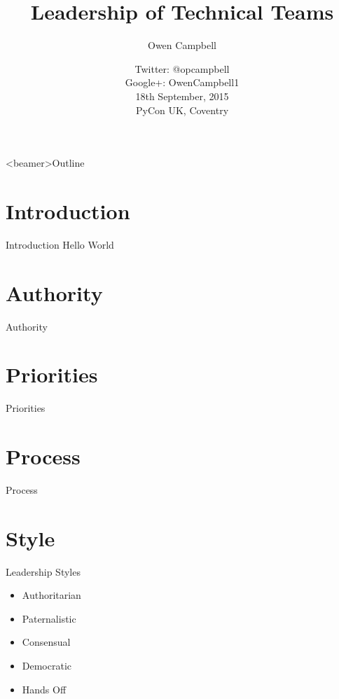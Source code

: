 \documentclass[14pt]{beamer}
\title{Leadership of Technical Teams}
\author{Owen Campbell}
\date[PyCon UK 2015]{
  Twitter: @opcampbell\\
  Google+: OwenCampbell1\\
  \vspace{1cm}
  18th September, 2015\\
  PyCon UK, Coventry}
\begin{document}
\begin{frame}
  \titlepage{}
\end{frame}

{
  \begin{frame}<beamer>{Outline}
    \tableofcontents
  \end{frame}
}

  \section{Introduction}

    \begin{frame}{Introduction}
      Hello World
    \end{frame}


  \section{Authority}

    \begin{frame}{Authority}
    \end{frame}

  \section{Priorities}

    \begin{frame}{Priorities}
      
    \end{frame}

  \section{Process}

    \begin{frame}{Process}
    \end{frame}

  \section{Style}

    \begin{frame}{Leadership Styles}
      \begin{itemize}
        \item Authoritarian
        \item Paternalistic
        \item Consensual
        \item Democratic
        \item Hands Off
      \end{itemize}
    \end{frame}
\end{document}
